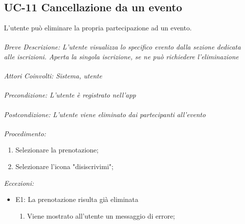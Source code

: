\subsection{UC-11 Cancellazione da un evento}
L'utente può eliminare la propria partecipazione ad un evento.
\\
\\
\textit{Breve Descrizione: L'utente visualizza lo specifico evento dalla sezione dedicata alle iscrizioni. Aperta la singola iscrizione, se ne può richiedere l'eliminazione} 
\\
\\
\textit{Attori Coinvolti: Sistema, utente}
\\
\\
\textit{Precondizione: L'utente è registrato nell'app}
\\
\\
\textit{Postcondizione: L'utente viene eliminato dai partecipanti all'evento}
\\
\\
\textit{Procedimento:}
\begin{enumerate}
	\item Selezionare la prenotazione;
	\item Selezionare l'icona "disiscrivimi";
\end{enumerate}


\textit{Eccezioni:}
\begin{itemize}
	\item E1: La prenotazione risulta già eliminata
	\begin{enumerate}
		\item Viene mostrato all'utente un messaggio di errore;
	\end{enumerate}
\end{itemize}